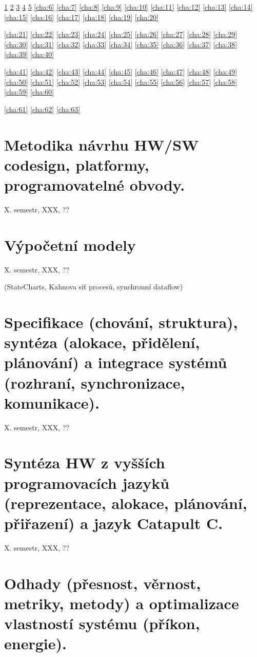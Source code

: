 \documentclass[a4paper, 11pt]{report}
\begin{document}
\ref{cha:1}
\ref{cha:2}
\ref{cha:3}
\ref{cha:4}
\ref{cha:5}
\ref{cha:6}
\ref{cha:7}
\ref{cha:8}
\ref{cha:9}
\ref{cha:10}
\ref{cha:11}
\ref{cha:12}
\ref{cha:13}
\ref{cha:14}
\ref{cha:15}
\ref{cha:16}
\ref{cha:17}
\ref{cha:18}
\ref{cha:19}
\ref{cha:20}

\ref{cha:21}
\ref{cha:22}
\ref{cha:23}
\ref{cha:24}
\ref{cha:25}
\ref{cha:26}
\ref{cha:27}
\ref{cha:28}
\ref{cha:29}
\ref{cha:30}
\ref{cha:31}
\ref{cha:32}
\ref{cha:33}
\ref{cha:34}
\ref{cha:35}
\ref{cha:36}
\ref{cha:37}
\ref{cha:38}
\ref{cha:39}
\ref{cha:40}

\ref{cha:41}
\ref{cha:42}
\ref{cha:43}
\ref{cha:44}
\ref{cha:45}
\ref{cha:46}
\ref{cha:47}
\ref{cha:48}
\ref{cha:49}
\ref{cha:50}
\ref{cha:51}
\ref{cha:52}
\ref{cha:53}
\ref{cha:54}
\ref{cha:55}
\ref{cha:56}
\ref{cha:57}
\ref{cha:58}
\ref{cha:59}
\ref{cha:60}

\ref{cha:61}
\ref{cha:62}
\ref{cha:63}
\newpage

\tableofcontents

\chapter{Metodika návrhu HW/SW codesign, platformy, programovatelné obvody.} \label{cha:1}
X. semestr, XXX, ??
\chapter{Výpočetní modely} \label{cha:2}
X. semestr, XXX, ??

(StateCharts, Kahnova síť procesů, synchronní dataflow)
\chapter{Specifikace (chování, struktura), syntéza (alokace, přidělení, plánování) a integrace systémů (rozhraní, synchronizace, komunikace).} \label{cha:3}
X. semestr, XXX, ??
\chapter{Syntéza HW z vyšších programovacích jazyků (reprezentace, alokace, plánování, přiřazení) a jazyk Catapult C.} \label{cha:4}
X. semestr, XXX, ??
\chapter{Odhady (přesnost, věrnost, metriky, metody) a optimalizace vlastností systému (příkon, energie).} \label{cha:5}
\end{document}
